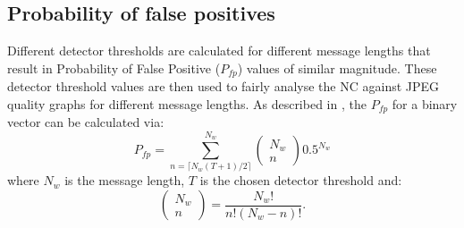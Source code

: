 \documentclass[10pt,twocolumn]{article}
\begin{document}
\subsection{Probability of false positives}
Different detector thresholds are calculated for different message lengths that result in Probability of False Positive
($P_{\mathit fp}$) 
values of similar magnitude.
These detector threshold values are then used to fairly analyse the NC against JPEG quality graphs 
for different message lengths.
As described in \cite{kundurPfp}, the $P_{fp}$ for a binary vector can be calculated via:
\begin{equation}
\label{eq:Pfp}
        P_{fp} = \sum^{N_{w}}_{n= \lceil N_{w}(T+1)/2 \rceil} \left(
                                                                        \begin{array}{c}
                                                                                N_{w} \\
                                                                                n
                                                                        \end{array}
                                                              \right)                           0.5^{N_{w}}
\end{equation}
where $N_{w}$ is the message length, $T$ is the chosen detector threshold and:
\begin{equation} 
\label{eq:PfpBKX_2}
								\left(
                                                                        \begin{array}{c}
                                                                                N_{w} \\
                                                                                n
                                                                        \end{array}
                                                              	\right)				=  	\frac{N_{w}!}{n!(N_{w}-n)!}.
\end{equation} 
\end{document}
